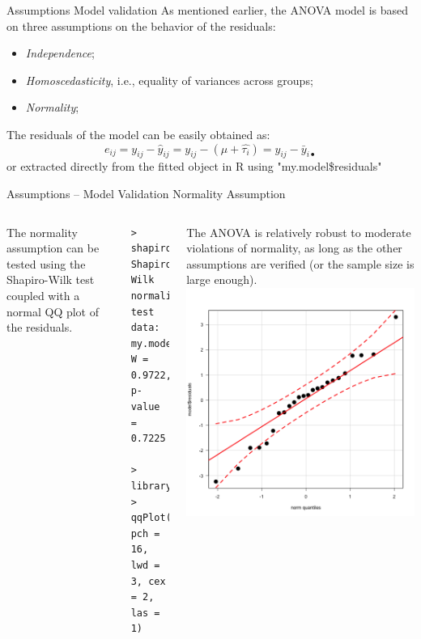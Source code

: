 %
%
\begin{frame}
{Assumptions}
{Model validation}
As mentioned earlier, the ANOVA model is based on three assumptions on the behavior of the residuals:
\begin{itemize}
  \item \textit{Independence};
  \item \textit{Homoscedasticity}, i.e., equality of variances across groups;
  \item \textit{Normality};
\end{itemize}
The residuals of the model can be easily obtained as:
\begin{equation*}
e_{ij} = y_{ij} - \hat{y}_{ij} = y_{ij} - \left(\hat{\mu} + \hat{\tau_i}\right) = y_{ij}-\bar{y}_{i\bullet}
\end{equation*}
\noindent or extracted directly from the fitted object in R using "my.model\$residuals"

\end{frame}
%
%
\begin{frame}[fragile]
{Assumptions -- Model Validation}
{Normality Assumption}

\begin{columns}
    The normality assumption can be tested using the Shapiro-Wilk test coupled with a normal QQ plot of the residuals.
    {\smaller
\begin{verbatim}
> shapiro.test(model$residuals)
Shapiro-Wilk normality test
data:  my.model$residuals
W = 0.9722, p-value = 0.7225

> library(car)
> qqPlot(my.model$residuals,
pch = 16, lwd = 3, cex = 2, las = 1)
\end{verbatim}}
    The ANOVA is relatively robust to moderate violations of normality, as long as the other assumptions are verified (or the sample size is large enough).
    \includegraphics[width=1\textwidth]{../img/paperqq.png}
  \end{columns}
\end{frame}
